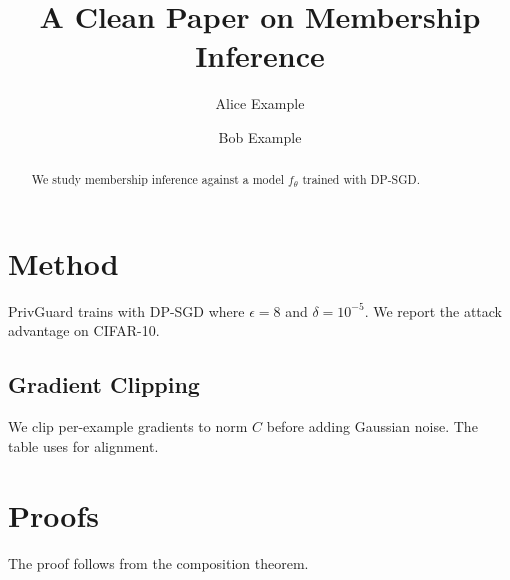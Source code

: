 \documentclass{article}
\newcommand{\sys}{PrivGuard}
\begin{document}
\title{A Clean Paper on Membership Inference}
\author{Alice Example \and Bob Example}
\maketitle

\begin{abstract}
We study membership inference against a model $f_\theta$ trained with DP-SGD.
\end{abstract}


% 

\section{Method}
\sys{} trains with DP-SGD where $\epsilon = 8$ and $\delta = 10^{-5}$.
We report the attack advantage on CIFAR-10.

\subsection{Gradient Clipping}
We clip per-example gradients to norm $C$ before adding Gaussian noise. %
The table uses \phantom{0} for alignment.




\appendix
\section{Proofs}
The proof follows from the composition theorem.
\end{document}
